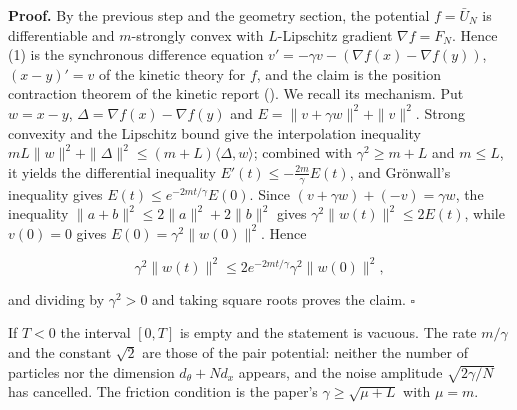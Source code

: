 \documentclass[11pt,a4paper]{article}
\begin{document}
\textbf{Proof.} By the previous step and the geometry section, the potential \(f=\bar U_N\) is differentiable and \(m\)-strongly convex with \(L\)-Lipschitz gradient \(\nabla f=F_N\). Hence (1) is the synchronous difference equation \(v'=-\gamma v-(\nabla f(x)-\nabla f(y))\), \((x-y)'=v\) of the kinetic theory for \(f\), and the claim is the position contraction theorem of the kinetic report (\cite[Section~3.6.5]{LangevinLean2026Kinetic}). We recall its mechanism. Put \(w=x-y\), \(\Delta=\nabla f(x)-\nabla f(y)\) and \(E=\|v+\gamma w\|^2+\|v\|^2\). Strong convexity and the Lipschitz bound give the interpolation inequality \(mL\|w\|^2+\|\Delta\|^2\le(m+L)\langle\Delta,w\rangle\); combined with \(\gamma^2\ge m+L\) and \(m\le L\), it yields the differential inequality \(E'(t)\le-\frac{2m}\gamma E(t)\), and Grönwall's inequality gives \(E(t)\le e^{-2mt/\gamma}E(0)\). Since \((v+\gamma w)+(-v)=\gamma w\), the inequality \(\|a+b\|^2\le2\|a\|^2+2\|b\|^2\) gives \(\gamma^2\|w(t)\|^2\le2E(t)\), while \(v(0)=0\) gives \(E(0)=\gamma^2\|w(0)\|^2\). Hence


\[\gamma^2\|w(t)\|^2\le2e^{-2mt/\gamma}\gamma^2\|w(0)\|^2,\]


and dividing by \(\gamma^2>0\) and taking square roots proves the claim. \(\square\)




If \(T<0\) the interval \([0,T]\) is empty and the statement is vacuous. The rate \(m/\gamma\) and the constant \(\sqrt2\) are those of the pair potential: neither the number of particles nor the dimension \(d_\theta+Nd_x\) appears, and the noise amplitude \(\sqrt{2\gamma/N}\) has cancelled. The friction condition is the paper's \(\gamma\ge\sqrt{\mu+L}\) with \(\mu=m\).
\end{document}
